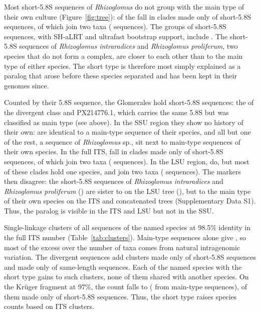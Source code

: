 \documentclass[11pt]{article}
\newcommand{\spn}[1]{\emph{#1}}   %
\begin{document}
Most short-5.8S sequences of \spn{Rhizoglomus} do not group with the main type of their own culture
(Figure~\ref{fig:tree}): \TreeShortInMulti{} of the \TreeShortTotal{} fall in \TreeShortMultiN{} clades made only
of short-5.8S sequences, \TreeShortCrossN{} of which join two taxa (\TreeShortCross{} sequences). The groups of
short-5.8S sequences, with SH-aLRT and ultrafast bootstrap support, include \TreeShortClades{}. The short-5.8S
sequences of \spn{Rhizoglomus intraradices} and \spn{Rhizoglomus proliferum}, two species that do not form a
complex, are closer to each other than to the main type of either species. The short type is therefore most simply
explained as a paralog that arose before these species separated and has been kept in their genomes since.

Counted by their 5.8S sequence, the Glomerales hold \ParShortN{} short-5.8S sequences: the \NShort{} of the
divergent class and PX214776.1, which carries the same 5.8S but was classified as main type (see above). In
the SSU region they show no history of their own: \ParSSUIdentical{} are
identical to a main-type sequence of their species, and all but one of the rest, a sequence of \spn{Rhizoglomus}
sp., sit next to main-type sequences of their own species. In the full ITS, \ParITSPure{} fall in clades made only
of short-5.8S sequences, \ParITSCrossN{} of which join two taxa (\ParITSCross{} sequences). In the LSU region,
\ParLSUPure{} do, but most of these clades hold one species, and \ParLSUCrossN{} join two taxa (\ParLSUCross{}
sequences). The markers then disagree: the \ParLSUIntraProlN{} short-5.8S sequences of \spn{Rhizoglomus
intraradices} and \spn{Rhizoglomus proliferum} (\ParLSUIntraProlSup{}) are sister to \ParLSUIntraProlSister{} on the
LSU tree (\ParLSUIntraProlSisterSup{}), but to the main type of their own species on the ITS and concatenated trees
(Supplementary Data S1). Thus, the paralog is visible in the ITS and LSU but not in the SSU.

Single-linkage clusters of all sequences of the \NSpecies{} named species at 98.5\% identity in the full ITS number
\ParITSNEAll{} (Table~\ref{tab:clusters}). Main-type sequences alone give \ParITSNEMain{}, so most of the excess
over the number of taxa comes from natural intragenomic variation. The divergent sequences add
\ParITSNEShort{} clusters made only of short-5.8S sequences and \ParITSNESame{} made only of same-length sequences.
Each of the \ParITSNESpN{} named species with the short type gains \ParITSNESpMin{} to \ParITSNESpMax{} such
clusters, none of them shared with another species. On the Kr\"uger fragment at 97\%, the count falls to
\ParKrNSAll{} (\ParKrNSMain{} from main-type sequences), \ParKrNSShort{} of them made only of short-5.8S sequences.
Thus, the short type raises species counts based on ITS clusters.
\end{document}
